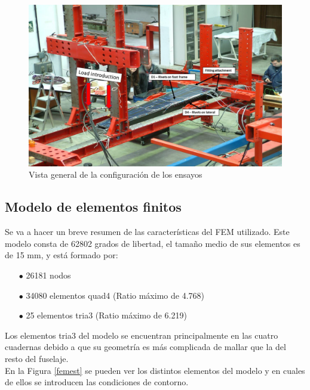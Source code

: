 \begin{figure}[ht]
    \centering
    \includegraphics[width=145mm]{3/Fotos/ensayo.png}
    \captionsetup{justification=centering,margin=1.25cm}
    \caption{Vista general de la configuración de los ensayos}
    \label{ensayo}
\end{figure}




\subsection{Modelo de elementos finitos}

Se va a hacer un breve resumen de las características del FEM utilizado. Este modelo consta de 62802 grados de libertad, el tamaño medio de sus elementos es de 15 mm, y está formado por:
\begin{itemize}
    \item[\tiny$\bullet$] 26181 nodos
    \item[\tiny$\bullet$] 34080 elementos quad4 (Ratio máximo de 4.768)
    \item[\tiny$\bullet$] 25 elementos tria3 (Ratio máximo de 6.219)
\end{itemize}

Los elementos tria3 del modelo se encuentran principalmente en las cuatro cuadernas debido a que su geometría es más complicada de mallar que la del resto del fuselaje.\\

En la Figura \ref{femest} se pueden ver los distintos elementos del modelo y en cuales de ellos se introducen las condiciones de contorno.

